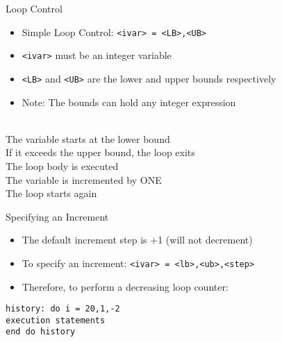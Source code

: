 \documentclass{beamer}
\begin{document}
\begin{frame}{Loop Control}

  \begin{itemize}
    \item Simple Loop Control: \texttt{<ivar> = <LB>,<UB>}
    \vfill\item \texttt{<ivar>} \alert{must} be an integer variable
    \vfill\item \texttt{<LB>} and \texttt{<UB>} are the lower and upper bounds respectively
    \vfill\item \alert{Note}: The bounds can hold any integer expression
  \end{itemize}
  \vfill
  {\color{blue}{The flow of a loop::}} \\
  The variable starts at the lower bound \\
  If it exceeds the upper bound, the loop exits \\
  The loop body is executed \\
  The variable is incremented by \alert{ONE} \\
  The loop starts again

\end{frame}
\begin{frame}{Specifying an Increment}

  \begin{itemize}
    \item The default increment step is +1 (will not decrement)
    \vfill\item To specify an increment: \texttt{<ivar> = <lb>,<ub>,<step>}
    \vfill\item Therefore, to perform a decreasing loop counter:
  \end{itemize}
  \vfill
  \texttt{history: do i = 20,1,-2} \\
    \hspace{0.1cm} \texttt{execution statements} \\
  \texttt{end do history}
\end{frame}
\end{document}
